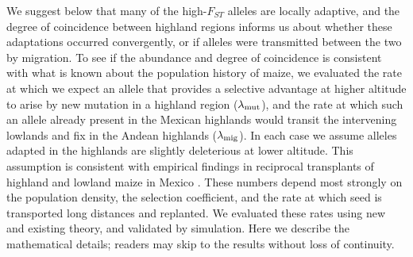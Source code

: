 We suggest below that many of the high-$F_{ST}$ alleles are locally adaptive,
and the degree of coincidence between highland regions informs us about 
whether these adaptations occurred convergently, 
or if alleles were transmitted between the two by migration.
To see if the abundance and degree of coincidence is consistent with what is known about the population history of maize,
we evaluated the rate at which we expect an allele that provides a selective advantage at higher altitude
to arise by new mutation in a highland region ($\lambda_{\text{mut}}$),
and the rate at which such an allele already present in the Mexican highlands
would transit the intervening lowlands and fix in the Andean highlands ($\lambda_{\text{mig}}$).
In each case we assume alleles adapted in the highlands are slightly deleterious at lower altitude.  This assumption is consistent with empirical findings in reciprocal transplants of highland and lowland maize in Mexico \cite[]{Mercer2008}.
These numbers depend most strongly on the population density, 
the selection coefficient,
and the rate at which seed is transported long distances and replanted.
We evaluated these rates using new and existing theory, and validated by simulation. Here we describe the mathematical details; readers may skip to the results without loss of continuity.


